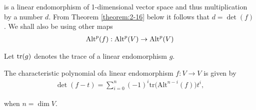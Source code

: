 is a linear endomorphism of 1-dimensional vector space and thus multiplication by a number $d$. From Theorem 
\ref{theorem:2-16} below it follows that $d = \det(f)$. We shall also be using other maps 
\begin{align*}
  \operatorname{Alt}^p(f): \operatorname{Alt}^p(V)\to\operatorname{Alt}^p(V)
\end{align*}

Let $\operatorname{tr}(g)$ denotes the trace of a linear endomorphism $g$.


\begin{theorem}\label{theorem:2-16}
  The characteristic polynomial ofa linear endomorphism $f:V\to V$ is given by
  \begin{align*}
    \det(f-t)=\sum\limits_{i=0}^n{(-1)}^i\mathrm{tr}\Big(\mathrm{Alt}^{n-i}(f)\Big)t^i,
  \end{align*}

  when $n = \dim V$.
\end{theorem}

